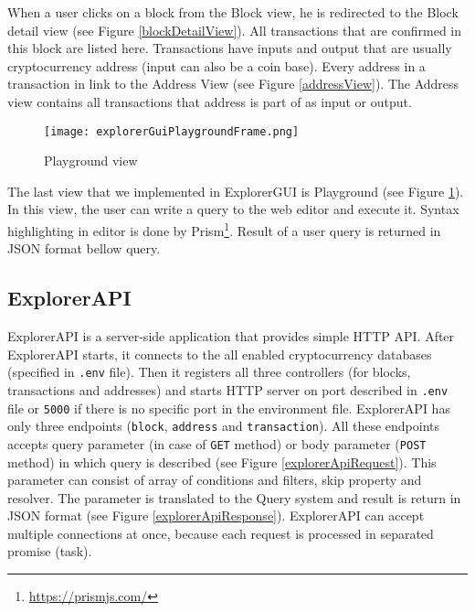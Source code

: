 When a user clicks on a block from the Block view, he is redirected to the Block detail view (see Figure \ref{blockDetailView}). All transactions that are confirmed in this block are listed here. Transactions have inputs and output that are usually cryptocurrency address (input can also be a coin base). Every address in a transaction in link to the Address View (see Figure \ref{addressView}). The Address view contains all transactions that address is part of as input or output.

\begin{figure}[h]
    \centering
    \texttt{[image: explorerGuiPlaygroundFrame.png]}
    \caption{Playground view}
    \label{playgroundView}
\end{figure}

The last view that we implemented in ExplorerGUI is Playground (see Figure \ref{playgroundView}). In this view, the user can write a query to the web editor and execute it. Syntax highlighting in editor is done by Prism\footnote{\url{https://prismjs.com/}}. Result of a user query is returned in JSON format bellow query.


\subsection{ExplorerAPI}
ExplorerAPI is a server-side application that provides simple HTTP API.
After ExplorerAPI starts, it connects to the all enabled cryptocurrency databases (specified in \texttt{.env} file). Then it registers all three controllers (for blocks, transactions and addresses) and starts HTTP server on port described in \texttt{.env} file or \texttt{5000} if there is no specific port in the environment file. ExplorerAPI has only three endpoints (\texttt{block}, \texttt{address} and \texttt{transaction}). All these endpoints accepts query parameter (in case of \texttt{GET} method) or body parameter (\texttt{POST} method) in which query is described (see Figure \ref{explorerApiRequest}). This parameter can consist of array of conditions and filters, skip property and resolver. The parameter is translated to the Query system and result is return in JSON format (see Figure \ref{explorerApiResponse}). ExplorerAPI can accept multiple connections at once, because each request is processed in separated promise (task).


